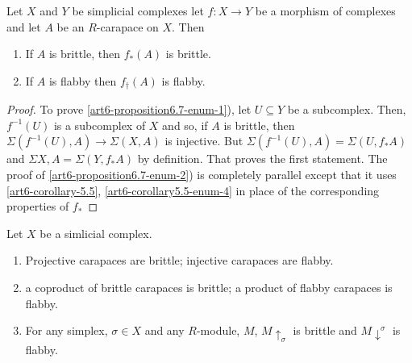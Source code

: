 \begin{prop}\label{art6-proposition-6.7}
Let $X$ and $Y$ be simplicial complexes let $f: X \rightarrow Y$ be a morphism of complexes and let $A$ be an $R$-carapace on $X$. Then
\begin{enumerate}[(1)]
\item If $A$ is brittle, then $f_{*}(A)$ is brittle.\label{art6-proposition6.7-enum-1}
\item If $A$ is flabby then $f_{\dagger}(A)$ is flabby. \label{art6-proposition6.7-enum-2}
\end{enumerate}
\end{prop}

\begin{proof}
To prove \ref{art6-proposition6.7-enum-1}), let $U\subseteq Y$ be a subcomplex. Then, $f^{-1}(U)$ is a subcomplex of $X$ and so, if $A$ is brittle, then $\Sigma(f^{-1}(U), A) \rightarrow \Sigma(X, A)$ is injective. But $\Sigma(f^{-1}(U), A)=\Sigma(U, f_{*}A)$ and $\Sigma{X, A} = \Sigma(Y, f_{*}A)$ by definition. That proves the first statement. The proof of \ref{art6-proposition6.7-enum-2}) is completely parallel except that it uses \ref{art6-corollary-5.5},
\ref{art6-corollary5.5-enum-4} in place of the corresponding properties of $f_{*}$
\end{proof}

\begin{prop}\label{art6-proposition-6.8}
Let $X$ be a simlicial complex.
\begin{enumerate}[(1)]
\item Projective carapaces are brittle; injective carapaces are flabby.\label{art6-proposition6.8-enum-1}
\item a coproduct of brittle carapaces is brittle; a product of flabby carapaces is flabby.\label{art6-proposition6.8-enum-2}
\item For any simplex, $\sigma \in X $ and any $R$-module, $M$, $M \uparrow_{\sigma}$ is brittle and $M\downarrow^{\sigma}$ is flabby.  \label{art6-proposition6.8-enum-3}
\end{enumerate}
\end{prop}

